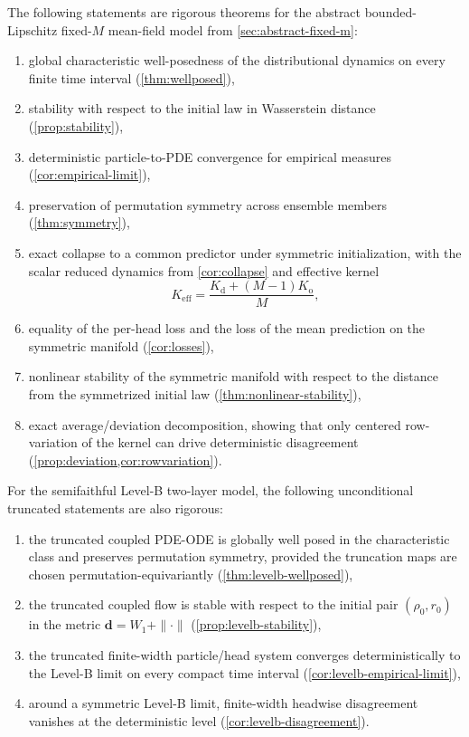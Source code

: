 \documentclass[11pt]{article}
\theoremstyle{definition}
\newcommand{\W}{W_1}
\begin{document}
The following statements are rigorous theorems for the abstract bounded-Lipschitz fixed-$M$ mean-field model from \cref{sec:abstract-fixed-m}:
\begin{enumerate}[leftmargin=2em]
  \item global characteristic well-posedness of the distributional dynamics on every finite time interval (\cref{thm:wellposed}),
  \item stability with respect to the initial law in Wasserstein distance (\cref{prop:stability}),
  \item deterministic particle-to-PDE convergence for empirical measures (\cref{cor:empirical-limit}),
  \item preservation of permutation symmetry across ensemble members (\cref{thm:symmetry}),
  \item exact collapse to a common predictor under symmetric initialization, with the scalar reduced dynamics from \cref{cor:collapse} and effective kernel
  \[
    K_{\mathrm{eff}}=\frac{K_{\mathrm d}+(M-1)K_{\mathrm o}}{M},
  \]
  \item equality of the per-head loss and the loss of the mean prediction on the symmetric manifold (\cref{cor:losses}),
  \item nonlinear stability of the symmetric manifold with respect to the distance from the symmetrized initial law (\cref{thm:nonlinear-stability}),
  \item exact average/deviation decomposition, showing that only centered row-variation of the kernel can drive deterministic disagreement (\cref{prop:deviation,cor:rowvariation}).
\end{enumerate}

For the semifaithful Level-B two-layer model, the following unconditional truncated statements are also rigorous:
\begin{enumerate}[leftmargin=2em]
  \item the truncated coupled PDE-ODE is globally well posed in the characteristic class and preserves permutation symmetry, provided the truncation maps are chosen permutation-equivariantly (\cref{thm:levelb-wellposed}),
  \item the truncated coupled flow is stable with respect to the initial pair $(\rho_0,r_0)$ in the metric $\mathbf d=\W+\|\cdot\|$ (\cref{prop:levelb-stability}),
  \item the truncated finite-width particle/head system converges deterministically to the Level-B limit on every compact time interval (\cref{cor:levelb-empirical-limit}),
  \item around a symmetric Level-B limit, finite-width headwise disagreement vanishes at the deterministic level (\cref{cor:levelb-disagreement}).
\end{enumerate}
\end{document}
